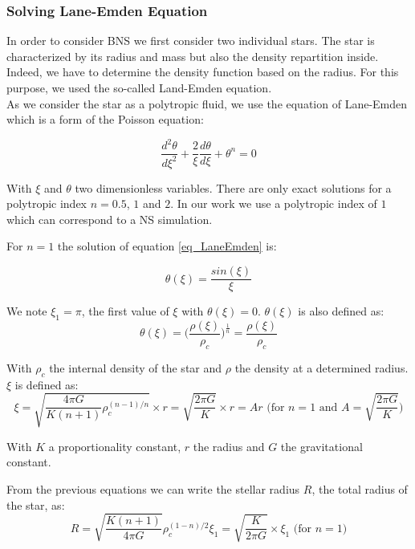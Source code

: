 \subsubsection{Solving Lane-Emden Equation}

In order to consider BNS we first consider two individual stars. 
The star is characterized by its radius and mass but also the density repartition inside.
Indeed, we have to determine the density function based on the radius. 
For this purpose, we used the so-called Land-Emden equation.\\

As we consider the star as a polytropic fluid, we use the equation of Lane-Emden which is a form of the Poisson equation: 

\begin{equation}\label{eq_LaneEmden}
  \frac{d^2\theta}{d \xi^2}+ \frac{2}{\xi}\frac{d\theta}{d\xi}+\theta^n = 0
\end{equation}

With $\xi$ and $\theta$ two dimensionless variables. 
There are only exact solutions for a polytropic index $n = 0.5$, $1$ and $2$.
In our work we use a polytropic index of $1$ which can correspond to a NS simulation.

For $n=1$ the solution of equation \ref{eq_LaneEmden} is: 

\begin{equation}
\theta(\xi)=\frac{sin(\xi)}{\xi}
\end{equation}

We note $\xi_1 = \pi$, the first value of $\xi$ with $\theta(\xi) = 0$.
$\theta(\xi)$ is also defined as: 
\begin{equation}
 \theta(\xi) = \Big(\frac{\rho(\xi)}{\rho_c}\Big)^{\frac{1}{n}}  = \frac{\rho(\xi)}{\rho_c}
\end{equation}

With $\rho_c$ the internal density of the star and $\rho$ the density at a determined radius. $\xi$ is defined as:  
$$ \xi = \sqrt{\frac{4\pi G}{K(n+1)}\rho_c^{(n-1)/n}} \times r = \sqrt{\frac{2\pi G}{K}}\times r = Ar\mbox{ (for } n=1 \mbox{ and } A=\sqrt{\frac{2\pi G}{K}} \mbox{)}$$

With $K$ a proportionality constant, $r$ the radius and $G$ the gravitational constant.

From the previous equations we can write the stellar radius $R$, the total radius of the star, as:
\begin{equation}
R = \sqrt{\frac{K(n+1)}{4\pi G}}\rho_c^{(1-n)/2}\xi_1 = \sqrt{ \frac{K}{2\pi G} } \times \xi_1 \mbox{ (for } n=1 \mbox{)}
\end{equation} 


